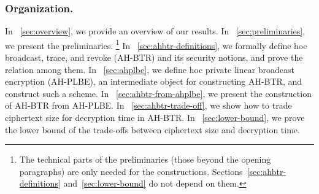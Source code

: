 \subsubsection{Organization.}
In \Section~\ref{sec:overview}, we provide an overview of our results.
In \Section~\ref{sec:preliminaries}, we present the preliminaries.%
\footnote{The technical parts of the preliminaries (those beyond the opening paragraphs) are only needed for the constructions.
Sections~\ref{sec:ahbtr-definitions} and~\ref{sec:lower-bound} do not depend on them.}
In \Section~\ref{sec:ahbtr-definitions}, we formally define \ad hoc broadcast, trace, and revoke (AH-BTR) and its security notions, and prove the relation among them.
In \Section~\ref{sec:ahplbe}, we define \ad hoc private linear broadcast encryption (AH-PLBE), an intermediate object for constructing AH-BTR, and construct such a scheme.
In \Section~\ref{sec:ahbtr-from-ahplbe}, we present the construction of AH-BTR from AH-PLBE\@.
In \Section~\ref{sec:ahbtr-trade-off}, we show how to trade ciphertext size for decryption time in AH-BTR\@.
In \Section~\ref{sec:lower-bound}, we prove the lower bound of the trade-offs between ciphertext size and decryption time.
